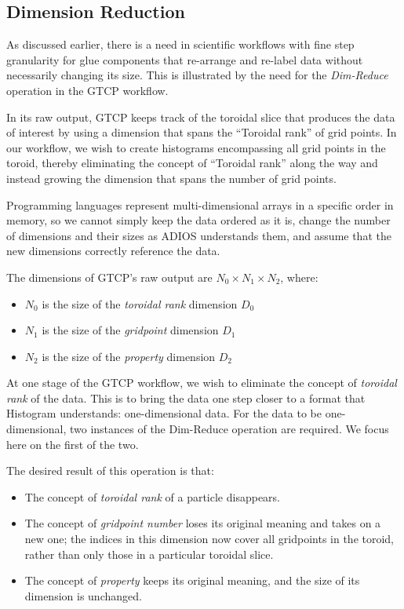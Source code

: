 \subsection{Dimension Reduction}
\label{subsec:dimreduce}
As discussed earlier, there is a need in
scientific workflows with fine
step granularity for glue components
that re-arrange and re-label data
without necessarily changing its size.
This is illustrated by the need for the {\em Dim-Reduce}
operation in the GTCP workflow.

In its raw output, GTCP keeps track of the
toroidal slice that produces the data of interest by using a
dimension that spans the ``Toroidal rank'' of grid points.
In our workflow, we
wish to create histograms encompassing all grid
points in the toroid, thereby
eliminating the concept of ``Toroidal rank''
along the way
and instead growing the dimension
that spans the number of grid points.

Programming languages represent multi-dimensional
arrays in a specific order in
memory, so we cannot simply keep the data
ordered as it is, change the number
of dimensions and their sizes as ADIOS understands them, 
and assume that the new dimensions correctly
reference the data.

The dimensions of GTCP's raw output are 
$N_0{\times}N_1{\times}N_2$, where:

\begin{itemize}

\item $N_0$ is the size of the {\em toroidal rank} dimension $D_0$

\item $N_1$ is the size of the {\em gridpoint} dimension $D_1$

\item $N_2$ is the size of the {\em property} dimension $D_2$

\end{itemize}

At one stage of the GTCP workflow, we wish
to eliminate the concept of
{\em toroidal rank} of the data. This is to bring the data one step
closer to a format that Histogram understands:
one-dimensional data.
For the data to be one-dimensional, two instances of the
Dim-Reduce operation are required.
We focus here on the first of the two.

The desired result of this operation is that:

\begin{itemize}

\item The concept of {\em toroidal rank} of a particle disappears.

\item The concept of {\em gridpoint number} loses its
  original meaning and takes
  on a new one; the indices in this dimension now
  cover all gridpoints in the toroid,
  rather than only those in a particular toroidal slice.
  
\item The concept of {\em property} keeps its original
  meaning, and the size of its dimension is unchanged.

\end{itemize}

